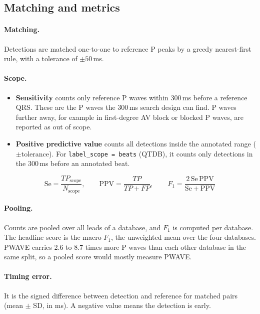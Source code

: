 \documentclass[11pt,a4paper]{article}
\newcommand{\code}[1]{\texttt{#1}}
\begin{document}
\subsection{Matching and metrics}
\label{sec:matching}

\paragraph{Matching.} Detections are matched one-to-one to reference P peaks by a greedy nearest-first rule, with a tolerance of $\pm50$\,ms.

\paragraph{Scope.}
\begin{itemize}
\item \textbf{Sensitivity} counts only reference P waves within 300\,ms before a reference QRS. These are the P waves the 300\,ms search design can find. P waves further away, for example in first-degree AV block or blocked P waves, are reported as out of scope.
\item \textbf{Positive predictive value} counts all detections inside the annotated range ($\pm$tolerance). For \code{label\_scope = beats} (QTDB), it counts only detections in the 300\,ms before an annotated beat.
\end{itemize}
\begin{equation}
\mathrm{Se} = \frac{TP_\mathrm{scope}}{N_\mathrm{scope}}, \qquad
\mathrm{PPV} = \frac{TP}{TP + FP}, \qquad
F_1 = \frac{2\,\mathrm{Se}\,\mathrm{PPV}}{\mathrm{Se} + \mathrm{PPV}}
\end{equation}

\paragraph{Pooling.} Counts are pooled over all leads of a database, and $F_1$ is computed per database. The headline score is the macro $F_1$, the unweighted mean over the four databases. PWAVE carries 2.6 to 8.7 times more P waves than each other database in the same split, so a pooled score would mostly measure PWAVE.

\paragraph{Timing error.} It is the signed difference between detection and reference for matched pairs (mean $\pm$ SD, in ms). A negative value means the detection is early.
\end{document}
